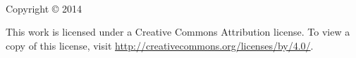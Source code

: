 \begin{center}
    \setlength{\parskip}{\baselineskip}
    \thetitle\\
    Copyright \copyright{} 2014 \theauthor

    {\Huge\ccby}

    This work is licensed under a Creative Commons Attribution license. To view
    a copy of this license, visit
    \url{http://creativecommons.org/licenses/by/4.0/}.
\end{center}

